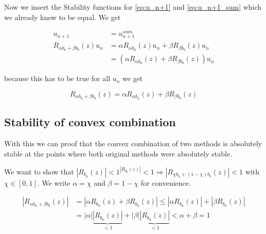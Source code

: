 \documentclass{article}
\begin{document}
Now we insert the Stability functions for \ref{eq:u_n+1} and \ref{eq:u_n+1_sum} which we already know to be equal. We get 

\begin{align}
u_{n+1} &= u_{n+1}^{sum} \\
R_{\alpha b_a+\beta b_b}(z) u_n &= \alpha R_{\alpha b_a}(z) u_n + \beta R_{\beta b_b}(z) u_n \\
&= (\alpha R_{\alpha b_a}(z) + \beta R_{\beta b_b}(z)) u_n
\end{align}

because this has to be true for all $u_n$ we get

\begin{equation}
R_{\alpha b_a+\beta b_b}(z) = \alpha R_{\alpha b_a}(z) + \beta R_{\beta b_b}(z) 
\end{equation}

\subsection{Stability of convex combination}

With this we can proof that the convex combination of two methods is absolutely stable at the points where both original methods were absolutely stable.

We want to show that $|R_{b_a}(z)|  < 1 ^ |R_{b_b}(z)| < 1\Rightarrow |R_{\chi b_a +(1- \chi) b_b}(z)| < 1$ with $\chi \in [0,1]$.
We write $\alpha = \chi$ and $\beta = 1-\chi$ for convenience.

\begin{align}
|R_{\alpha b_a +\beta b_b}(z)| &= |\alpha R_{b_a}(z) + \beta R_{b_a}(z)| \leq |\alpha R_{b_a}(z)| + |\beta R_{b_a}(z)|\\
 &=| \alpha| \underbrace{|R_{b_a}(z)|}_{<1} + |\beta| \underbrace{|R_{b_a}(z)|}_{<1} < \alpha + \beta = 1
\end{align}
\end{document}
